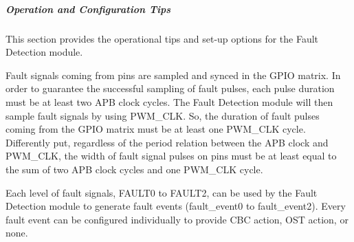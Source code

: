 \documentclass[main\_\_EN.tex]{subfiles}
\begin{document}
\subparagraph{Operation and Configuration Tips}
This section provides the operational tips and set-up options for the Fault Detection module.

Fault signals coming from pins are sampled and synced in the GPIO matrix. In order to guarantee the successful sampling of fault pulses, each pulse duration must be at least two APB clock cycles. The Fault Detection module will then sample fault signals by using PWM\_CLK. So, the duration of fault pulses coming from the GPIO matrix must be at least one PWM\_CLK cycle. Differently put, regardless of the period relation between the APB clock and PWM\_CLK, the width of fault signal pulses on pins must be at least equal to the sum of two APB clock cycles and one PWM\_CLK cycle.

Each level of fault signals, FAULT0 to FAULT2, can be used by the Fault Detection module to generate fault events (fault\_event0 to fault\_event2). Every fault event can be configured individually to provide CBC action, OST action, or none.
\end{document}
